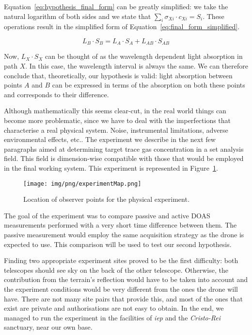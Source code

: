 Equation~\ref{eq:hypothesis_final_form} can be greatly simplified: we
take the natural logarithm of both sides and we state that $\sum_i
\sigma_{Xi} \cdot c_{Xi} = S_i$. These operations result in the
simplified form of Equation~\ref{eq:final_form_simplified}.

\begin{equation}
    \label{eq:final_form_simplified}
    L_B \cdot S_B = L_A \cdot S_A + L_{AB} \cdot S_{AB}
\end{equation}

Now, $L_X \cdot S_X$ can be thought of as the wavelength dependent light
absorption in path $X$. In this case, the wavelength interval is always
the same. We can therefore conclude that, theoretically, our
hypothesis is valid: light absorption between points $A$ and $B$ can be
expressed in terms of the absorption on both these points and
corresponds to their difference.

Although mathematically this seems clear-cut, in the real world things
can become more problematic, since we have to deal with the
imperfections that characterise a real physical system. Noise,
instrumental limitations, adverse environmental effects, etc.. The
experiment we describe in the next few paragraphs aimed at determining
target trace gas concentration in a set analysis field. This field is
dimension-wise compatible with those that would be employed in the final
working system. This experiment is represented in
Figure~\ref{fig:experiment_map}.

\begin{figure}[htpb]
    \centering
    \texttt{[image: img/png/experimentMap.png]}
    \caption{Location of observer points for the physical experiment.}
    \label{fig:experiment_map}
\end{figure}

The goal of the experiment was to compare passive and active \gls{DOAS}
measurements performed with a very short time difference between them.
The passive measurement would employ the same acquisition strategy as
the drone is expected to use. This comparison will be used to test our
second hypothesis.

Finding two appropriate experiment sites proved to be the first
difficulty: both telescopes should see sky on the back of the other
telescope. Otherwise, the contribution from the terrain's reflection
would have to be taken into account and the experiment conditions would
be very different from the ones the drone will have. There are not many
site pairs that provide this, and most of the ones that exist are
private and authorisations are not easy to obtain. In the end, we
managed to run the experiment in the facilities of \emph{\gls{iep}} and
the \emph{Cristo-Rei} sanctuary, near our own base. 
